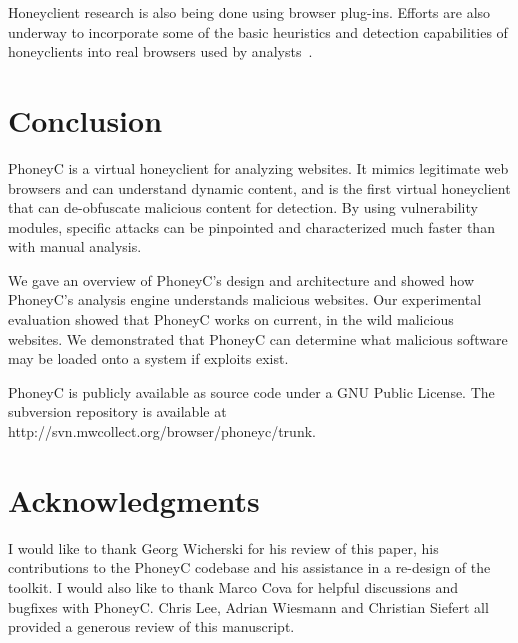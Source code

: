 \documentclass[10pt,twocolumn]{article}
\begin{document}
Honeyclient research is also being done using browser plug-ins. Efforts are also underway to incorporate some of the basic heuristics and detection capabilities of honeyclients into real browsers used by analysts~\cite{hallaraker2005dmj}. 

\section{Conclusion}
\label{conclusion}

PhoneyC is a virtual honeyclient for analyzing websites. It mimics legitimate web browsers and can understand dynamic content, and is the first virtual honeyclient that can de-obfuscate malicious content for detection. By using vulnerability modules, specific attacks can be pinpointed and characterized much faster than with manual analysis. 

We gave an overview of PhoneyC's design and architecture and showed how PhoneyC's analysis engine understands malicious websites. Our experimental evaluation showed that PhoneyC works on current, in the wild malicious websites. We demonstrated that PhoneyC can determine what malicious software may be loaded onto a system if exploits exist. 

PhoneyC is publicly available as source code under a GNU Public License. The subversion repository is available at http://svn.mwcollect.org/browser/phoneyc/trunk. 

\section*{Acknowledgments}
\label{acks}

I would like to thank Georg Wicherski for his review of this paper, his contributions to the PhoneyC codebase and his assistance in a re-design of the toolkit. I would also like to thank Marco Cova for helpful discussions and bugfixes with PhoneyC. Chris Lee, Adrian Wiesmann and Christian Siefert all provided a generous review of this manuscript.

\scriptsize


\normalsize
\end{document}
